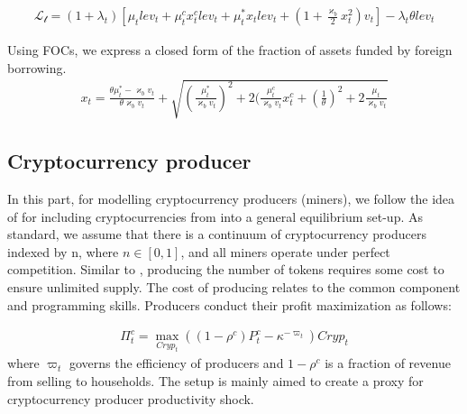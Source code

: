 \documentclass[12pt, a4paper]{article}
\begin{document}
\begin{align}
    \mathcal{L_t} =(1+\lambda_t)\left[\mu_t lev_t +\mu^c_t x^c_t lev_t + \mu^*_t x_t lev_t +\left(1+\frac{\varkappa_{b}}{2} x^2_t\right)v_t \right] -\lambda_t\theta lev_t
\end{align}

Using FOCs, we express a closed form of the fraction of assets funded by foreign borrowing.
\begin{align}
    x_t= \frac{\theta \mu^*_t -\varkappa_{b} v_t }{\theta \varkappa_{b} v_t} +\sqrt{\left(\frac{\mu^*_t}{\varkappa_{b} v_t}\right)^2 +2(\frac{\mu^c_t}{\varkappa_{b} v_t} x^c_t +\left(\frac{1}{\theta}\right)^2 +2\frac{\mu_t}{\varkappa_{b} v_t}}
\end{align}
\subsection{Cryptocurrency producer}
In this part, for modelling cryptocurrency producers (miners), we follow the idea of \cite{asimakopoulos2019new} for including cryptocurrencies from \cite{sockin2018model} into a general equilibrium set-up. As standard, we assume that there is a continuum of cryptocurrency producers indexed by n, where $n \in [0, 1]$, and all miners operate under perfect competition. Similar to \cite{sockin2018model}, producing the number of tokens requires some cost to ensure unlimited supply. The cost of producing relates to the common component and programming skills. Producers conduct their profit maximization as follows:

\begin{align}
\Pi^c_t = \max_{Cryp_t} \left((1-\rho^c)P^c_t -\kappa^{-\varpi_t}\right) Cryp_t  
\end{align}
where $\varpi_t$ governs the efficiency of producers and $ 1-\rho^c$ is  a fraction of revenue from selling to households. The setup is mainly aimed to create a proxy for cryptocurrency producer productivity shock.
\end{document}
